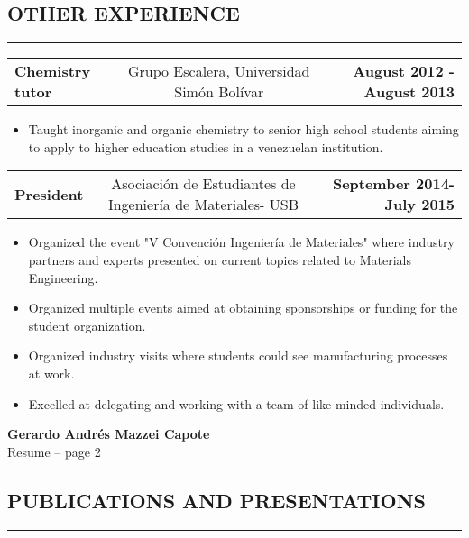 \documentclass[11pt,letterpaper]{article}
\makeatletter
\newcommand{\headerrow}[3]
{\vspace{0.4em}
\noindent
\begin{tabular*}{\textwidth}{l @{\extracolsep{\fill}} cr}
	\textbf{#1} & %
	#2 &		  %
	\textbf{#3}\\ %
\end{tabular*}}
\makeatother
\begin{document}
\subsection*{OTHER EXPERIENCE}

\vspace{-0.5em}
\hrule
	
	\headerrow
		{Chemistry tutor}
		{Grupo Escalera, Universidad Simón Bolívar} %
		{August 2012 - August 2013}
	\begin{itemize}
		\item Taught inorganic and organic chemistry to senior high school students aiming to apply to higher education studies in a venezuelan institution.
\end{itemize}	
	\headerrow
		{President}
		{Asociación de Estudiantes de Ingeniería de Materiales- USB} %
		{September 2014- July 2015}
		\begin{itemize}
			\item Organized the event "V Convención Ingeniería de Materiales" where industry partners and experts presented on current topics related to Materials Engineering.
			\item Organized multiple events aimed at obtaining sponsorships or funding for the student organization.
			\item Organized industry visits where students could see manufacturing processes at work. 
			\item Excelled at delegating and working with a team of like-minded individuals.
	\end{itemize}
	
\pagebreak %
\thispagestyle{empty} %

\begin{center}
	\LARGE \textbf{Gerardo Andrés Mazzei Capote} \\
	\normalsize Resume -- page 2
\end{center}

\subsection*{PUBLICATIONS AND PRESENTATIONS}

	\vspace{-0.5em}
	\hrule
	
\end{document}
